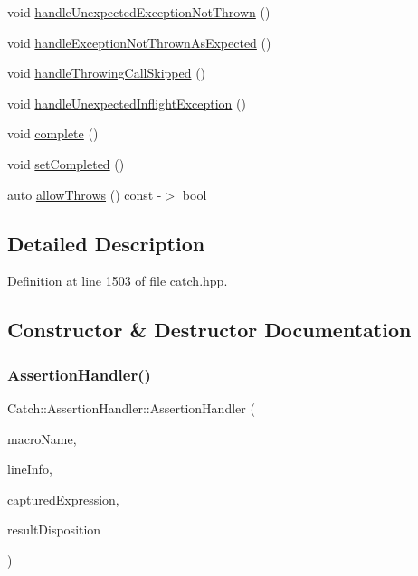 \begin{DoxyCompactItemize}
void \mbox{\hyperlink{class_catch_1_1_assertion_handler_a7764d0adb6ed5eeb10964f6abc02fab1}{handle\+Unexpected\+Exception\+Not\+Thrown}} ()
\item 
void \mbox{\hyperlink{class_catch_1_1_assertion_handler_a51e4936e3af43b74690cedae6d2e297a}{handle\+Exception\+Not\+Thrown\+As\+Expected}} ()
\item 
void \mbox{\hyperlink{class_catch_1_1_assertion_handler_a67a194d5518f307c4a16faa03a7f7442}{handle\+Throwing\+Call\+Skipped}} ()
\item 
void \mbox{\hyperlink{class_catch_1_1_assertion_handler_aa2504dad6a91f3645e5f52c932c11270}{handle\+Unexpected\+Inflight\+Exception}} ()
\item 
void \mbox{\hyperlink{class_catch_1_1_assertion_handler_a878a9eb828d8a1863c8dcb6575f6f40e}{complete}} ()
\item 
void \mbox{\hyperlink{class_catch_1_1_assertion_handler_a6756bd5395c0ddd28764a9fb4612d5e4}{set\+Completed}} ()
\item 
auto \mbox{\hyperlink{class_catch_1_1_assertion_handler_a193bb3999494c46457f3059184c6b251}{allow\+Throws}} () const -\/$>$ bool
\end{DoxyCompactItemize}


\subsection{Detailed Description}


Definition at line 1503 of file catch.\+hpp.



\subsection{Constructor \& Destructor Documentation}
\mbox{\label{class_catch_1_1_assertion_handler_a74627e1e399b026e9acbaf95ea673643}} 
\subsubsection{\texorpdfstring{Assertion\+Handler()}{AssertionHandler()}}
{\footnotesize\ttfamily Catch\+::\+Assertion\+Handler\+::\+Assertion\+Handler (\begin{DoxyParamCaption}\item[{\mbox{\hyperlink{class_catch_1_1_string_ref}{String\+Ref}}}]{macro\+Name,  }\item[{\mbox{\hyperlink{struct_catch_1_1_source_line_info}{Source\+Line\+Info}} const \&}]{line\+Info,  }\item[{\mbox{\hyperlink{class_catch_1_1_string_ref}{String\+Ref}}}]{captured\+Expression,  }\item[{\mbox{\hyperlink{struct_catch_1_1_result_disposition_a3396cad6e2259af326b3aae93e23e9d8}{Result\+Disposition\+::\+Flags}}}]{result\+Disposition }\end{DoxyParamCaption})}

